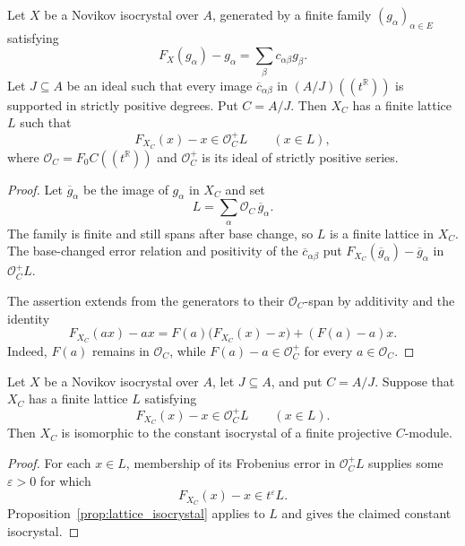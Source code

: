 \begin{lemma}
  \label{lem:positive_frobenius_error_lattice}
  \leanok
  Let $X$ be a Novikov isocrystal over $A$, generated by a finite family
  $(g_\alpha)_{\alpha\in E}$ satisfying
  \[
    F_X(g_\alpha)-g_\alpha
      =\sum_\beta c_{\alpha\beta}g_\beta.
  \]
  Let $J\subseteq A$ be an ideal such that every image
  $\overline c_{\alpha\beta}$ in $(A/J)((t^{\mathbb{R}}))$ is supported in
  strictly positive degrees.  Put $C=A/J$.  Then $X_C$ has a finite lattice
  $L$ such that
  \[
    F_{X_C}(x)-x\in\mathcal O_C^+L
    \qquad(x\in L),
  \]
  where $\mathcal O_C=F_0C((t^{\mathbb{R}}))$ and
  $\mathcal O_C^+$ is its ideal of strictly positive series.
\end{lemma}

\begin{proof}
  \leanok
  Let $\overline g_\alpha$ be the image of $g_\alpha$ in $X_C$ and set
  \[
    L=\sum_\alpha\mathcal O_C\,\overline g_\alpha.
  \]
  The family is finite and still spans after base change, so $L$ is a finite
  lattice in $X_C$.  The base-changed error relation and positivity of the
  $\overline c_{\alpha\beta}$ put
  $F_{X_C}(\overline g_\alpha)-\overline g_\alpha$ in
  $\mathcal O_C^+L$.

  The assertion extends from the generators to their $\mathcal O_C$-span by
  additivity and the identity
  \[
    F_{X_C}(ax)-ax
      =F(a)\bigl(F_{X_C}(x)-x\bigr)+(F(a)-a)x.
  \]
  Indeed, $F(a)$ remains in $\mathcal O_C$, while
  $F(a)-a\in\mathcal O_C^+$ for every $a\in\mathcal O_C$.
\end{proof}

\begin{lemma}
  \label{lem:positive_error_lattice_isocrystal_const}
  \leanok
  Let $X$ be a Novikov isocrystal over $A$, let $J\subseteq A$, and put
  $C=A/J$.  Suppose that $X_C$ has a finite lattice $L$ satisfying
  \[
    F_{X_C}(x)-x\in\mathcal O_C^+L
    \qquad(x\in L).
  \]
  Then $X_C$ is isomorphic to the constant isocrystal of a finite projective
  $C$-module.
\end{lemma}

\begin{proof}
  \leanok
  For each $x\in L$, membership of its Frobenius error in
  $\mathcal O_C^+L$ supplies some $\varepsilon>0$ for which
  \[
    F_{X_C}(x)-x\in t^\varepsilon L.
  \]
  Proposition~\ref{prop:lattice_isocrystal} applies to $L$ and gives the
  claimed constant isocrystal.
\end{proof}

